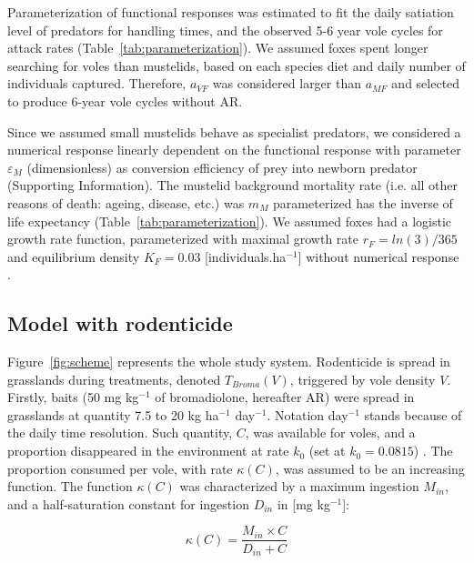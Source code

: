 \documentclass[11pt]{article}
\begin{document}
Parameterization of functional responses was estimated to fit the daily satiation level of predators for handling times, and the observed 5-6 year vole cycles for attack rates (Table~\ref{tab:parameterization}). We assumed foxes spent longer searching for voles than mustelids, based on each species diet and daily number of individuals captured. Therefore, $a_{VF}$ was considered larger than $a_{MF}$ and selected to produce 6-year vole cycles without AR.


Since we assumed small mustelids behave as specialist predators, we considered a numerical response linearly dependent on the functional response with parameter $\varepsilon_M$ (dimensionless) as conversion efficiency of prey into newborn predator (Supporting Information). The mustelid background mortality rate (i.e. all other reasons of death: ageing, disease, etc.) was $m_M$ parameterized has the inverse of life expectancy (Table~\ref{tab:parameterization}). 
We assumed foxes had a logistic growth rate function, parameterized with maximal growth rate $r_F = ln(3)/365$ and equilibrium density $K_F = 0.03$ [individuals.ha$^{-1}$] \citep{Ruette2003} without numerical response \citep{Weber2002}. 

\subsection{Model with rodenticide}

Figure~\ref{fig:scheme} represents the whole study system. Rodenticide is spread in grasslands during treatments, denoted $T_{Broma}(V)$, triggered by vole density $V$.
%
Firstly, baits (50 mg kg$^{-1}$  of bromadiolone, hereafter AR) were spread in grasslands at quantity 7.5 to 20 kg ha$^{-1}$ day$^{-1}$. Notation day$^{-1}$ stands because of the daily time resolution.
%
Such quantity, $C$, was available for voles, and a proportion disappeared in the environment at rate $k_0$ (set at $k_0 = 0.0815$) \citep{Sage2008}. The proportion consumed per vole, with rate $\kappa(C)$, was assumed to be an increasing function. The function $\kappa(C)$ was characterized by a maximum ingestion $M_{in}$, and a half-saturation constant for ingestion $D_{in}$ in [mg kg$^{-1}$]:

\begin{equation}
\kappa(C)= \dfrac{M_{in}\times C}{D_{in} + C}
\end{equation}
\end{document}
